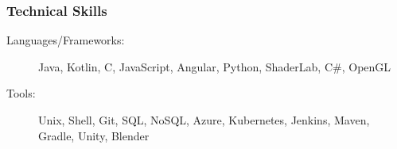 \documentclass{article}
\begin{document}
\subsubsection*{Technical Skills}
    \begin{description}    
        \item[Languages/Frameworks:] 
            Java, 
            Kotlin,
            C,
            JavaScript,
            Angular,
            Python,
            ShaderLab, 
            C\#,
            OpenGL

            \vspace{0.5em}

        \item[Tools:] 
            Unix,
            Shell,
            Git,
            SQL,
            NoSQL,
            Azure,
            Kubernetes,
            Jenkins,
            Maven,
            Gradle,
            Unity,
            Blender
    \end{description}
\end{document}
